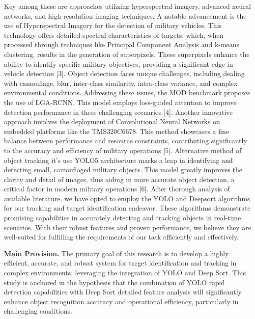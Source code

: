Key among these are approaches utilizing hyperspectral imagery, advanced
neural networks, and high-resolution imaging techniques. A notable
advancement is the use of Hyperspectral Imagery for the detection of
military vehicles. This technology offers detailed spectral
characteristics of targets, which, when processed through techniques
like Principal Component Analysis and k-means clustering, results in the
generation of superpixels. These superpixels enhance the ability to
identify specific military objectives, providing a significant edge in
vehicle detection {[}3{]}. Object detection faces unique challenges,
including dealing with camouflage, blur, inter-class similarity,
intra-class variance, and complex environmental conditions. Addressing
these issues, the MOD benchmark proposes the use of LGA-RCNN. This model
employs loss-guided attention to improve detection performance in these
challenging scenarios {[}4{]}. Another innovative approach involves the
deployment of Convolutional Neural Networks on embedded platforms like
the TMS320C6678. This method showcases a fine balance between
performance and resource constraints, contributing significantly to the
accuracy and efficiency of military operations {[}5{]}. Alternative
method of object tracking it's use YOLO5 architecture marks a leap in
identifying and detecting small, camouflaged military objects. This
model greatly improves the clarity and detail of images, thus aiding in
more accurate object detection, a critical factor in modern military
operations {[}6{]}. After thorough analysis of available literature, we
have opted to employ the YOLO and Deepsort algorithms for our tracking
and target identification endeavor. These algorithms demonstrate
promising capabilities in accurately detecting and tracking objects in
real-time scenarios. With their robust features and proven performance,
we believe they are well-suited for fulfilling the requirements of our
task efficiently and effectively.

\textbf{Main Provision.} The primary goal of this research is to develop
a highly efficient, accurate, and robust system for target
identification and tracking in complex environments, leveraging the
integration of YOLO and Deep Sort. This study is anchored in the
hypothesis that the combination of YOLO rapid detection capabilities
with Deep Sort detailed feature analysis will significantly enhance
object recognition accuracy and operational efficiency, particularly in
challenging conditions.


